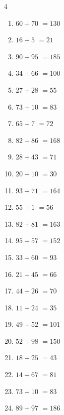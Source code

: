 \begin{multicols}{4}
\begin{enumerate}
  \item $60+70$
        $=130$

  \item $16+5$
        $=21$

  \item $90+95$
        $=185$

  \item $34+66$
        $=100$

  \item $27+28$
        $=55$

  \item $73+10$
        $=83$

  \item $65+7$
        $=72$

  \item $82+86$
        $=168$

  \item $28+43$
        $=71$

  \item $20+10$
        $=30$

  \item $93+71$
        $=164$

  \item $55+1$
        $=56$

  \item $82+81$
        $=163$

  \item $95+57$
        $=152$

  \item $33+60$
        $=93$

  \item $21+45$
        $=66$

  \item $44+26$
        $=70$

  \item $11+24$
        $=35$

  \item $49+52$
        $=101$

  \item $52+98$
        $=150$

  \item $18+25$
        $=43$

  \item $14+67$
        $=81$

  \item $73+10$
        $=83$

  \item $89+97$
        $=186$


\end{enumerate}
\end{multicols}

